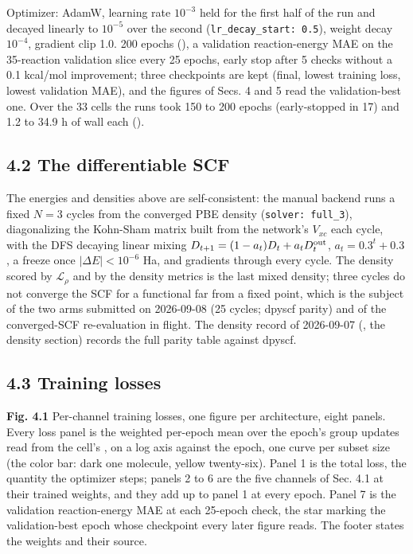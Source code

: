 \documentclass[10pt,a4paper]{article}
\begin{document}
Optimizer: AdamW, learning rate $10^{-3}$ held for the first half of the run and decayed linearly to $10^{-5}$ over the second (\texttt{lr\_decay\_start: 0.5}), weight decay $10^{-4}$, gradient clip 1.0. 200 epochs (), a validation reaction-energy MAE on the 35-reaction validation slice every 25 epochs, early stop after 5 checks without a 0.1 kcal/mol improvement; three checkpoints are kept (final, lowest training loss, lowest validation MAE), and the figures of Secs. 4 and 5 read the validation-best one. Over the 33 cells the runs took 150 to 200 epochs (early-stopped in 17) and 1.2 to 34.9 h of wall each ().

\subsection*{4.2 The differentiable SCF}

The energies and densities above are self-consistent: the manual backend runs a fixed $N = 3$ cycles from the converged PBE density (\texttt{solver: full\_3}), diagonalizing the Kohn-Sham matrix built from the network's $V_{xc}$ each cycle, with the DFS decaying linear mixing $D_{t+1} = (1 - a_t) D_t + a_t D^{\rm out}_t$, $a_t = 0.3^{t} + 0.3$, a freeze once $|\Delta E| < 10^{-6}$ Ha, and gradients through every cycle. The density scored by $\mathcal{L}_\rho$ and by the density metrics is the last mixed density; three cycles do not converge the SCF for a functional far from a fixed point, which is the subject of the two arms submitted on 2026-09-08 (25 cycles; dpyscf parity) and of the converged-SCF re-evaluation in flight. The density record of 2026-09-07 (, the density section) records the full parity table against dpyscf.

\subsection*{4.3 Training losses}

\textbf{Fig. 4.1} Per-channel training losses, one figure per architecture, eight panels. Every loss panel is the weighted per-epoch mean over the epoch's group updates read from the cell's , on a log axis against the epoch, one curve per subset size (the color bar: dark one molecule, yellow twenty-six). Panel 1 is the total loss, the quantity the optimizer steps; panels 2 to 6 are the five channels of Sec. 4.1 at their trained weights, and they add up to panel 1 at every epoch. Panel 7 is the validation reaction-energy MAE at each 25-epoch check, the star marking the validation-best epoch whose checkpoint every later figure reads. The footer states the weights and their source.
\end{document}
